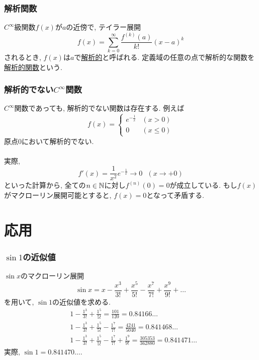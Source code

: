 \begin{frame}
\frametitle{解析関数}

\begin{Def}
$C^\infty$級関数$f(x)$が$a$の近傍で, テイラー展開
$$
f(x) = \sum_{k=0}^{\infty}\frac{f^{(k)}(a)}{k!}(x-a)^k 
$$
されるとき, $f(x)$は$a$で\underline{解析的}と呼ばれる. 定義域の任意の点で解析的な関数を\underline{解析的関数}という. 
\end{Def}

\end{frame}





\begin{frame}
\frametitle{解析的でない$C^\infty$関数}


$C^\infty$関数であっても, 解析的でない関数は存在する. 例えば
$$
f(x) = 
\begin{cases}
e^{-\frac{1}{x}}  & (x>0) \\
0 & (x \le 0) 
 \end{cases}
$$
原点$0$において解析的でない. \\
\ \\

実際, 
$$
f'(x)=\frac{1}{x^2}e^{-\frac{1}{x}} \longrightarrow 0 \ \ \ (x \to +0)
$$
といった計算から, 全ての$n \in \mathbb{N}$に対し$f^{(n)}(0)=0$が成立している. 
もし$f(x)$がマクローリン展開可能とすると, $f(x)=0$となって矛盾する. 
\end{frame}





\section{応用}

\begin{frame}
\frametitle{$\sin 1$の近似値}

$\sin x$のマクローリン展開 
$$
\sin x = x-\frac{x^3}{3!}+\frac{x^5}{5!}-\frac{x^7}{7!}+\frac{x^9}{9!}+\dots 
$$
を用いて, $\sin 1$の近似値を求める. 
\begin{align*}
& 1-\frac{1^3}{3!}+\frac{1^5}{5!} = \frac{101}{120}=0.84166\dots \\
& 1-\frac{1^3}{3!}+\frac{1^5}{5!}-\frac{1^7}{7!} = \frac{4241}{5040}=0.841468\dots \\
& 1-\frac{1^3}{3!}+\frac{1^5}{5!}-\frac{1^7}{7!}+\frac{1^9}{9!} = \frac{305353}{362880}=0.841471\dots
\end{align*}
実際, $\sin 1 = 0.841470\dots$. 
\end{frame}






